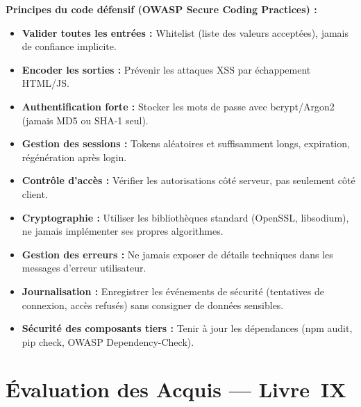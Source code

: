 \begin{boxinfo}
\textbf{Principes du code défensif (OWASP Secure Coding Practices) :}
\begin{itemize}
    \item \textbf{Valider toutes les entrées :} Whitelist (liste des valeurs acceptées), jamais de confiance implicite.
    \item \textbf{Encoder les sorties :} Prévenir les attaques XSS par échappement HTML/JS.
    \item \textbf{Authentification forte :} Stocker les mots de passe avec bcrypt/Argon2 (jamais MD5 ou SHA-1 seul).
    \item \textbf{Gestion des sessions :} Tokens aléatoires et suffisamment longs, expiration, régénération après login.
    \item \textbf{Contrôle d'accès :} Vérifier les autorisations côté serveur, pas seulement côté client.
    \item \textbf{Cryptographie :} Utiliser les bibliothèques standard (OpenSSL, libsodium), ne jamais implémenter ses propres algorithmes.
    \item \textbf{Gestion des erreurs :} Ne jamais exposer de détails techniques dans les messages d'erreur utilisateur.
    \item \textbf{Journalisation :} Enregistrer les événements de sécurité (tentatives de connexion, accès refusés) sans consigner de données sensibles.
    \item \textbf{Sécurité des composants tiers :} Tenir à jour les dépendances (npm audit, pip check, OWASP Dependency-Check).
\end{itemize}
\end{boxinfo}

\section{Évaluation des Acquis --- Livre~IX}

